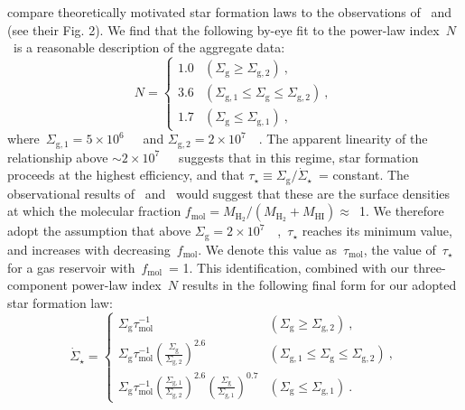 \citet{Krumholz2018a} compare theoretically motivated star formation laws to 
the observations of~\citet{Bigiel2010} and~\citet{Leroy2013} (see their Fig. 2). 
We find that the following by-eye fit to the power-law index~$N$~is a 
reasonable description of the aggregate data: 
\begin{equation} 
N = \begin{cases} 
1.0 & (\Sigma_\text{g} \geq \Sigma_{\text{g},2})~, \\ 
3.6 & (\Sigma_{\text{g},1} \leq \Sigma_\text{g} \leq \Sigma_{\text{g},2})~, \\ 
1.7 & (\Sigma_\text{g} \leq \Sigma_{\text{g},1})~, 
\end{cases} 
\label{migration:eq:sf_law_indeces} 
\end{equation} 
where~$\Sigma_{\text{g},1} = 5\times10^6$~\msun~\persqkpc~and 
$\Sigma_{\text{g},2} = 2\times10^7$~\msun~\persqkpc. 
The apparent linearity of the relationship above 
$\sim2\times10^7$~\msun~\persqkpc~suggests that in this regime, star formation 
proceeds at the highest efficiency, and that 
$\tau_\star \equiv \Sigma_\text{g}/\dot{\Sigma}_\star$~= constant. 
The observational results of~\citet{Leroy2013} and~\citet{Kennicutt2021} would 
suggest that these are the surface densities at which the molecular fraction 
$f_\text{mol} = M_{\text{H}_2} / (M_{\text{H}_2} + M_\text{HI}) \approx$~1. 
We therefore adopt the assumption that above 
$\Sigma_\text{g} = 2\times10^7$~\msun~\persqkpc,~$\tau_\star$ reaches its 
minimum value, and increases with decreasing~$f_\text{mol}$. 
We denote this value as~$\tau_\text{mol}$, the value of~$\tau_\star$ for a gas 
reservoir with~$f_\text{mol}$~= 1. 
This identification, combined with our three-component power-law index~$N$ 
results in the following final form for our adopted star formation law: 
\begin{equation} 
\dot{\Sigma}_\star = \begin{cases} 
\Sigma_\text{g} \tau_\text{mol}^{-1} & 
(\Sigma_\text{g} \geq \Sigma_{\text{g},2})~, 
\\ 
\Sigma_\text{g} \tau_\text{mol}^{-1} \left(\frac{
	\Sigma_\text{g}
}{
	\Sigma_{\text{g},2} 
}\right)^{2.6} & 
(\Sigma_{\text{g},1} \leq \Sigma_\text{g} \leq \Sigma_{\text{g},2})~, 
\\ 
\Sigma_\text{g} \tau_\text{mol}^{-1} \left(\frac{
	\Sigma_{\text{g},1} 
}{
	\Sigma_{\text{g},2} 
}\right)^{2.6}\left(\frac{
	\Sigma_\text{g}
}{
	\Sigma_{\text{g},1} 
}\right)^{0.7} & 
(\Sigma_\text{g} \leq \Sigma_{\text{g},1})~. 
\end{cases} 
\label{migration:eq:sf_law} 
\end{equation} 

